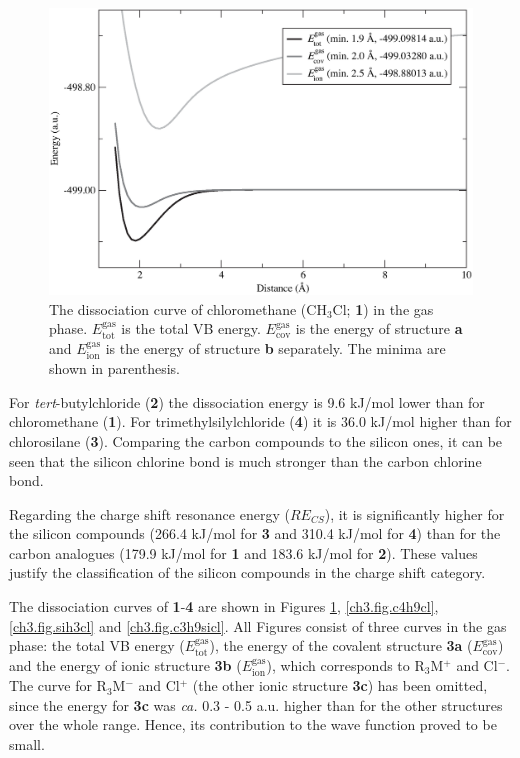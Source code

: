 \begin{figure}[hbtp]
\begin{center}
\includegraphics[scale=0.55]{dissociation/figures/ch3cl_g.eps}
\end{center}
\caption{The dissociation curve of chloromethane (CH$_3$Cl; \textbf{1}) in the gas phase. $E_\mathrm{tot}^\mathrm{gas}$ is the total VB energy. $E_\mathrm{cov}^\mathrm{gas}$ is the energy of structure \textbf{a} and $E_\mathrm{ion}^\mathrm{gas}$ is the energy of structure \textbf{b} separately. The minima are shown in parenthesis.}
\label{ch3.fig.ch3cl}
\end{figure}

For \textit{tert}-butylchloride (\textbf{2}) the dissociation energy is 9.6 kJ/mol lower than for chloromethane (\textbf{1}). For trimethylsilylchloride (\textbf{4}) it is 36.0 kJ/mol higher than for chlorosilane (\textbf{3}). Comparing the carbon compounds to the silicon ones, it can be seen that the silicon chlorine bond is much stronger than the carbon chlorine bond.

Regarding the charge shift resonance energy ($RE_{CS}$), it is significantly higher for the silicon compounds (266.4 kJ/mol for \textbf{3} and 310.4 kJ/mol for \textbf{4}) than for the carbon analogues (179.9 kJ/mol for \textbf{1} and 183.6 kJ/mol for \textbf{2}). These values justify the classification of the silicon compounds in the charge shift category.

The dissociation curves of \textbf{1}-\textbf{4} are shown in Figures \ref{ch3.fig.ch3cl}, \ref{ch3.fig.c4h9cl}, \ref{ch3.fig.sih3cl} and \ref{ch3.fig.c3h9sicl}. All Figures consist of three curves in the gas phase: the total VB energy ($E_\mathrm{tot}^\mathrm{gas}$), the energy of the covalent structure \textbf{3a} ($E_\mathrm{cov}^\mathrm{gas}$) and the energy of ionic structure \textbf{3b} ($E_\mathrm{ion}^\mathrm{gas}$), which corresponds to R$_3$M$^{+}$ and Cl$^{-}$. The curve for R$_3$M$^{-}$ and Cl$^{+}$ (the other ionic structure \textbf{3c}) has been omitted, since the energy for \textbf{3c} was \textit{ca.} 0.3 - 0.5 a.u. higher than for the other structures over the whole range. Hence, its contribution to the wave function proved to be small.


